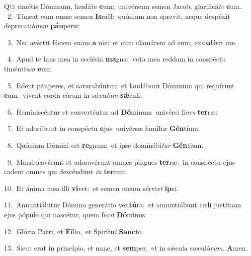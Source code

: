 \lettrine{\initial\textcolor{\initialcolor}{Q}}{ui} timétis Dóminum, laudáte \textbf{e}\-um:~\star univérsum semen Jacob, glorificá\textit{te} \textbf{e}\-um.\\
{\numbfont\textcolor{\numbcolor}{~2.}}~Tímeat eum omne semen \textbf{Is}\-raël:~\star quóniam non sprevit, neque despéxit deprecatió\textit{nem} \textbf{páu}\-peris:\par
{\numbfont\textcolor{\numbcolor}{~3.}}~Nec avértit fáciem suam \textbf{a} me:~\star et cum clamárem ad eum, ex\-\textit{au}\-\textbf{dí}vit me.\par
{\numbfont\textcolor{\numbcolor}{~4.}}~Apud te laus mea in ecclésia \textbf{ma}\-gna:~\star vota mea reddam in conspéctu timénti\textit{um} \textbf{e}\-um.\par
{\numbfont\textcolor{\numbcolor}{~5.}}~Edent páuperes, et saturabúntur:~\dagger et laudábunt Dóminum qui requírunt \textbf{e}\-um:~\star vivent corda eórum in sǽcu\textit{lum} \textbf{sǽ}\-culi.\par
{\numbfont\textcolor{\numbcolor}{~6.}}~Reminiscéntur et converténtur ad \textbf{Dó}\-minum~\star univérsi fi\textit{nes} \textbf{ter}\-ræ:\par
{\numbfont\textcolor{\numbcolor}{~7.}}~Et adorábunt in conspéctu \textbf{e}\-jus~\star univérsæ famíli\textit{æ} \textbf{Gén}\-tium.\par
{\numbfont\textcolor{\numbcolor}{~8.}}~Quóniam Dómini est \textbf{re}\-gnum:~\star et ipse dominábi\textit{tur} \textbf{Gén}\-tium.\par
{\numbfont\textcolor{\numbcolor}{~9.}}~Manducavérunt et adoravérunt omnes pingues \textbf{ter}\-ræ:~\star in conspéctu ejus cadent omnes qui descéndunt \textit{in} \textbf{ter}\-ram.\par
{\numbfont\textcolor{\numbcolor}{10.}}~Et ánima mea illi \textbf{vi}\-vet:~\star et semen meum sérvi\textit{et} \textbf{ip}\-si.\par
{\numbfont\textcolor{\numbcolor}{11.}}~Annuntiábitur Dómino generátio ven\-\textbf{tú}\-ra:~\star et annuntiábunt cæli justítiam ejus pópulo qui nascétur, quem fe\textit{cit} \textbf{Dó}\-minus.\par
{\numbfont\textcolor{\numbcolor}{12.}}~Glória Patri, et \textbf{Fí}\-lio,~\star et Spirítu\textit{i} \textbf{Sanc}\-to.\par
{\numbfont\textcolor{\numbcolor}{13.}}~Sicut erat in princípio, et nunc, et \textbf{sem}\-per,~\star et in sǽcula sæculó\-\textit{rum}\-. \textbf{A}\-men.\par
